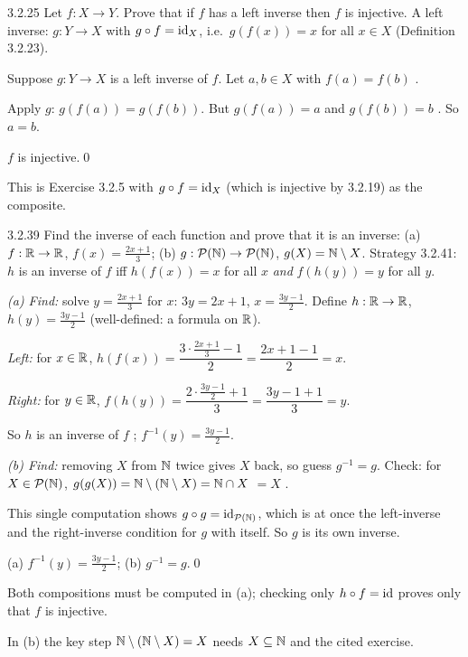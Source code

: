 \begin{bookex}[recommended]{3.2.25}
Let $f:X\to Y$. Prove that if $f$ has a left inverse then $f$ is injective.
\solution
\given A left inverse: $g:Y\to X$ with $g\circ f=\mathrm{id}_X$, i.e.\ $g(f(x))=x$ for all $x\in X$ (Definition 3.2.23).
\begin{steps}
\item Suppose $g:Y\to X$ is a left inverse of $f$. Let $a,b\in X$ with $f(a)=f(b)$ .
\item Apply $g$: $g(f(a))=g(f(b))$. But $g(f(a))=a$ and $g(f(b))=b$ . So $a=b$.
\end{steps}
\conclusion $f$ is injective.\qed
\begin{compare}
\item This is Exercise 3.2.5 with $g\circ f=\mathrm{id}_X$ (which is injective by 3.2.19) as the composite.
\end{compare}
\end{bookex}

\begin{bookex}[recommended (a), (b)]{3.2.39}
Find the inverse of each function and prove that it is an inverse: (a) $f:\mathbb{R}\to\mathbb{R}$, $f(x)=\frac{2x+1}3$; (b) $g:\mathcal{P}(\mathbb{N})\to\mathcal{P}(\mathbb{N})$, $g(X)=\mathbb{N}\setminus X$.
\solution
\given Strategy 3.2.41: $h$ is an inverse of $f$ iff $h(f(x))=x$ for all $x$ \emph{and} $f(h(y))=y$ for all $y$.
\begin{steps}
\item \emph{(a) Find:} solve $y=\frac{2x+1}3$ for $x$: $3y=2x+1$, $x=\frac{3y-1}2$. Define $h:\mathbb{R}\to\mathbb{R}$, $h(y)=\frac{3y-1}2$ (well-defined: a formula on $\mathbb{R}$).
\item \emph{Left:} for $x\in\mathbb{R}$, $h(f(x))=\dfrac{3\cdot\frac{2x+1}3-1}2=\dfrac{2x+1-1}2=x$.
\item \emph{Right:} for $y\in\mathbb{R}$, $f(h(y))=\dfrac{2\cdot\frac{3y-1}2+1}3=\dfrac{3y-1+1}3=y$.
\item So $h$ is an inverse of $f$ ; $f^{-1}(y)=\frac{3y-1}2$.
\item \emph{(b) Find:} removing $X$ from $\mathbb{N}$ twice gives $X$ back, so guess $g^{-1}=g$. Check: for $X\in\mathcal{P}(\mathbb{N})$, $g(g(X))=\mathbb{N}\setminus(\mathbb{N}\setminus X)=\mathbb{N}\cap X$  $=X$ .
\item This single computation shows $g\circ g=\mathrm{id}_{\mathcal{P}(\mathbb{N})}$, which is at once the left-inverse and the right-inverse condition for $g$ with itself. So $g$ is its own inverse.
\end{steps}
\conclusion (a) $f^{-1}(y)=\frac{3y-1}2$; (b) $g^{-1}=g$.\qed
\begin{compare}
\item Both compositions must be computed in (a); checking only $h\circ f=\mathrm{id}$ proves only that $f$ is injective.
\item In (b) the key step $\mathbb{N}\setminus(\mathbb{N}\setminus X)=X$ needs $X\subseteq\mathbb{N}$ and the cited exercise.
\end{compare}
\end{bookex}

